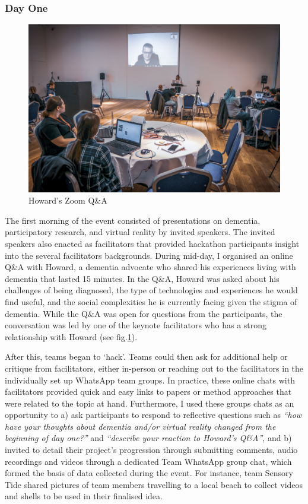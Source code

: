 \subsubsection{Day One}
\label{DayOne}

\begin{figure}[htp]
\centering
\includegraphics[width=.4\linewidth]{Images/DemVR/Howard.jpg}
\caption{Howard's Zoom Q\&A}
\label{fig:Howard}
\end{figure}
The first morning of the event consisted of presentations on dementia, participatory research, and virtual reality by invited speakers. The invited speakers also enacted as facilitators that provided hackathon participants insight into the several facilitators backgrounds. During mid-day, I organised an online Q\&A with Howard, a dementia advocate who shared his experiences living with dementia that lasted 15 minutes. In the Q\&A, Howard was asked about his challenges of being diagnosed, the type of technologies and experiences he would find useful, and the social complexities he is currently facing given the stigma of dementia. While the Q\&A was open for questions from the participants, the conversation was led by one of the keynote facilitators who has a strong relationship with Howard (see fig.\ref{fig:Howard}).

After this, teams began to `hack'. Teams could then ask for additional help or critique from facilitators, either in-person or reaching out to the facilitators in the individually set up WhatsApp team groups. In practice, these online chats with facilitators provided quick and easy links to papers or method approaches that were related to the topic at hand. Furthermore, I used these groups chats as an opportunity to a) ask participants to respond to reflective questions such as \textit{``how have your thoughts about dementia and/or virtual reality changed from the beginning of day one?''} and \textit{``describe your reaction to Howard’s Q\&A''}, and b) invited to detail their project’s progression through submitting comments, audio recordings and videos through a dedicated Team WhatsApp group chat, which formed the basis of data collected during the event. For instance, team Sensory Tide shared pictures of team members travelling to a local beach to collect videos and shells to be used in their finalised idea.


